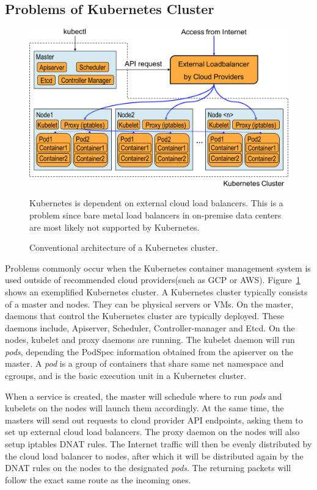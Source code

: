 \subsection{Problems of Kubernetes Cluster}

\begin{figure}[tb]
\includegraphics[width=\columnwidth]{Figs/K8sConventional}
\caption{Conventional architecture of a Kubernetes cluster.}
  Kubernetes is dependent on external cloud load balancers.
This is a problem since bare metal load balancers in on-premise data centers are most likely not supported by Kubernetes.
\label{fig:K8sConventional}
\end{figure}

Problems commonly occur when the Kubernetes container management system is used outside of recommended cloud providers(such as GCP or AWS).
Figure~\ref{fig:K8sConventional} shows an exemplified Kubernetes cluster.
A Kubernetes cluster typically consists of a master and nodes. They can be physical servers or VMs.
On the master, daemons that control the Kubernetes cluster are typically deployed. 
These daemons include, Apiserver, Scheduler, Controller-manager and Etcd. 
On the nodes, kubelet and proxy daemons are running.
The kubelet daemon will run {\it pods}, depending the PodSpec information obtained from the apiserver on the master.
A {\em pod} is a group of containers that share same net namespace and cgroups, 
and is the basic execution unit in a Kubernetes cluster.

When a service is created, the master will schedule where to run {\em pods} and kubelets on the nodes will launch them accordingly.
At the same time, the masters will send out requests to cloud provider API endpoints, asking them to set up external cloud load balancers.
The proxy daemon on the nodes will also setup iptables DNAT\cite{MartinA.Brown2017} rules. 
The Internet traffic will then be evenly distributed by the cloud load balancer to nodes, 
after which it will be distributed again by the DNAT rules on the nodes to the designated {\em pods}. 
The returning packets will follow the exact same route as the incoming ones.

